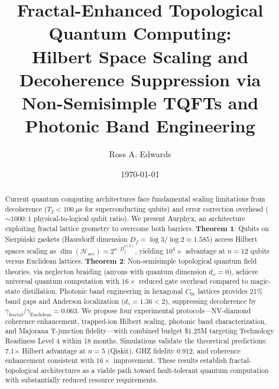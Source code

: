 \documentclass[aps,prx,twocolumn,superscriptaddress,showpacs,showkeys,floatfix]{revtex4-2}
\newcommand{\Hilbert}{\mathcal{H}}
\newcommand{\Df}{D_f}
\theoremstyle{plain}
\theoremstyle{definition}
\begin{document}
\title{Fractal-Enhanced Topological Quantum Computing: \\
Hilbert Space Scaling and Decoherence Suppression via \\
Non-Semisimple TQFTs and Photonic Band Engineering}

\author{Ross A. Edwards}

\date{\today}

\begin{abstract}
Current quantum computing architectures face fundamental scaling limitations from decoherence ($T_2 < 100~\mu$s for superconducting qubits) and error correction overhead ($\sim 1000:1$ physical-to-logical qubit ratio). We present Aurphyx, an architecture exploiting fractal lattice geometry to overcome both barriers. \textbf{Theorem 1}: Qubits on Sierpi\'{n}ski gaskets (Hausdorff dimension $\Df = \log 3/\log 2 \approx 1.585$) access Hilbert spaces scaling as $\dim(\Hilbert_{\mathrm{acc}}) = 2^{n \cdot \Df^{\alpha(k)}}$, yielding $10^4\times$ advantage at $n = 12$ qubits versus Euclidean lattices. \textbf{Theorem 2}: Non-semisimple topological quantum field theories, via neglecton braiding (anyons with quantum dimension $d_\omega = 0$), achieve universal quantum computation with $16\times$ reduced gate overhead compared to magic-state distillation. Photonic band engineering in hexagonal $C_{6v}$ lattices provides 21\% band gaps and Anderson localization ($d_s = 1.36 < 2$), suppressing decoherence by $\gamma_{\mathrm{fractal}}/\gamma_{\mathrm{Euclidean}} = 0.063$. We propose four experimental protocols---NV-diamond coherence enhancement, trapped-ion Hilbert scaling, photonic band characterization, and Majorana T-junction fidelity---with combined budget \$1.25M targeting Technology Readiness Level 4 within 18 months. Simulations validate the theoretical predictions: 7.1$\times$ Hilbert advantage at $n = 5$ (Qiskit), GHZ fidelity 0.912, and coherence enhancement consistent with $16\times$ improvement. These results establish fractal-topological architectures as a viable path toward fault-tolerant quantum computation with substantially reduced resource requirements.
\end{abstract}


\maketitle
\end{document}
